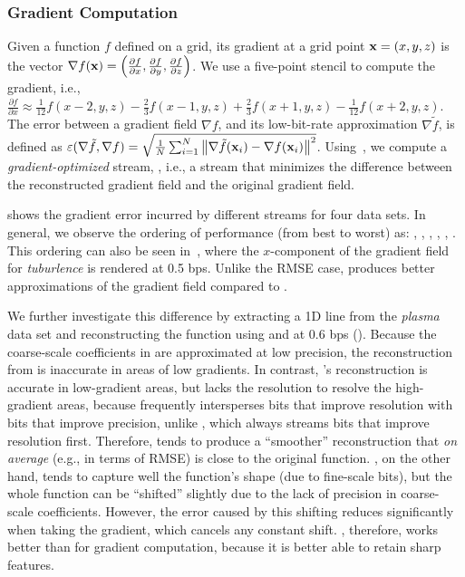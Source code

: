 \subsubsection{Gradient Computation} \label{sec:gradient}

Given a function $f$ defined on a grid, its gradient at a grid point \mbox{$\x = (x,y,z)$} is the
vector $\nabla f(\x) = \left(\frac{\partial f}{\partial x}, \frac{\partial f}{\partial y},
\frac{\partial f}{\partial z}\right)$. We use a five-point stencil to compute the gradient, i.e.,
$\frac{\partial f}{\partial x} \approx \frac{1}{12}f(x-2,y,z) - \frac{2}{3}f(x-1,y,z) +
\frac{2}{3}f(x+1,y,z) - \frac{1}{12}f(x+2,y,z)$. The error between a gradient field $\nabla f$, and
its low-bit-rate approximation $\nabla
\tilde{f}$, is defined as $\err(\nabla \tilde{f}, \nabla f) = \sqrt{\frac{1}{N}
\sum_{i=1}^{N}{\norm{\nabla \tilde{f}(\x_i)-\nabla f(\x_i)}^2}}$. Using~, we
compute a \emph{gradient-optimized} stream, \sgop, i.e., a stream that minimizes the difference
between the reconstructed gradient field and the original gradient field.

 shows the gradient error incurred by different streams for four
data sets. In general, we observe the ordering of performance (from best to worst) as: \sgop, \sgsg,
\sbit, \swav, \smag, \slvl. This ordering can also be seen in~,
where the $x$-component of the gradient field for \emph{tuburlence} is rendered at 0.5 bps. Unlike
the RMSE case, \sbit produces better approximations of the gradient field compared to \swav.

We further investigate this difference by extracting a 1D line from the \emph{plasma} data set and
reconstructing the function using \sbit and \swav at 0.6 bps
(). Because the coarse-scale coefficients in \sbit are
approximated at low precision, the reconstruction from \sbit is inaccurate in areas of low
gradients. In contrast, \swav's reconstruction is accurate in low-gradient areas, but lacks the
resolution to resolve the high-gradient areas, because \swav frequently intersperses bits that
improve resolution with bits that improve precision, unlike \sbit, which always streams bits that
improve resolution first. Therefore, \swav tends to produce a ``smoother'' reconstruction that
\emph{on average} (e.g., in terms of RMSE) is close to the original function. \sbit, on the other
hand, tends to capture well the function's shape (due to fine-scale bits), but the whole function
can be ``shifted'' slightly due to the lack of precision in coarse-scale coefficients. However, the
error caused by this shifting reduces significantly when taking the gradient, which cancels any
constant shift. \sbit, therefore, works better than \swav for gradient computation, because it is
better able to retain sharp features.



